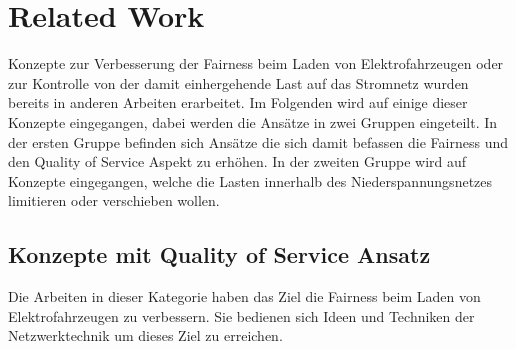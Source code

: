 \chapter{Related Work}
Konzepte zur Verbesserung der Fairness beim Laden von Elektrofahrzeugen oder zur Kontrolle von der damit einhergehende Last auf das Stromnetz wurden bereits in anderen Arbeiten erarbeitet. Im Folgenden wird auf einige dieser Konzepte eingegangen, dabei werden die Ansätze in zwei Gruppen eingeteilt. In der ersten Gruppe befinden sich Ansätze die sich damit befassen die Fairness und den Quality of Service Aspekt zu erhöhen. In der zweiten Gruppe wird auf Konzepte eingegangen, welche die Lasten innerhalb des Niederspannungsnetzes limitieren oder verschieben wollen.
\section{Konzepte mit Quality of Service Ansatz}
Die Arbeiten in dieser Kategorie haben das Ziel die Fairness beim Laden von Elektrofahrzeugen zu verbessern. Sie bedienen sich Ideen und Techniken der Netzwerktechnik um dieses Ziel zu erreichen.\\
